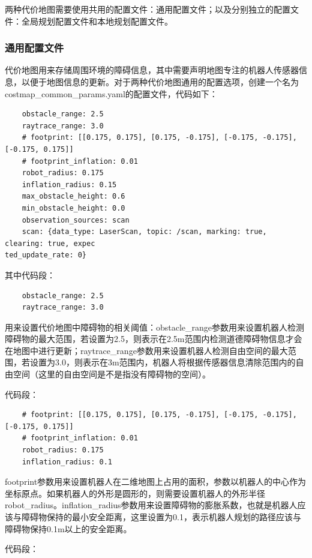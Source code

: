 \documentclass[9pt, oneside]{book}
\begin{document}
两种代价地图需要使用共用的配置文件：通用配置文件；以及分别独立的配置文件：全局规划配置文件和本地规划配置文件。

\subsubsection{通用配置文件}

代价地图用来存储周围环境的障碍信息，其中需要声明地图专注的机器人传感器信息，以便于地图信息的更新。对于两种代价地图通用的配置选项，创建一个名为costmap\_common\_params.yaml的配置文件，代码如下：

\begin{verbatim}
    obstacle_range: 2.5
    raytrace_range: 3.0
    # footprint: [[0.175, 0.175], [0.175, -0.175], [-0.175, -0.175], [-0.175, 0.175]]
    # footprint_inflation: 0.01
    robot_radius: 0.175
    inflation_radius: 0.15
    max_obstacle_height: 0.6
    min_obstacle_height: 0.0
    observation_sources: scan
    scan: {data_type: LaserScan, topic: /scan, marking: true, clearing: true, expec
ted_update_rate: 0}
\end{verbatim}

其中代码段：

\begin{verbatim}
    obstacle_range: 2.5
    raytrace_range: 3.0
\end{verbatim}

用来设置代价地图中障碍物的相关阈值：obstacle\_range参数用来设置机器人检测障碍物的最大范围，若设置为2.5，则表示在2.5m范围内检测道德障碍物信息才会在地图中进行更新；raytrace\_range参数用来设置机器人检测自由空间的最大范围，若设置为3.0，则表示在3m范围内，机器人将根据传感器信息清除范围内的自由空间\textcolor[rgb]{1,0,0}{（这里的自由空间是不是指没有障碍物的空间）}。

代码段：

\begin{verbatim}
    # footprint: [[0.175, 0.175], [0.175, -0.175], [-0.175, -0.175], [-0.175, 0.175]]
    # footprint_inflation: 0.01
    robot_radius: 0.175
    inflation_radius: 0.1
\end{verbatim}

footprint参数用来设置机器人在二维地图上占用的面积，参数以机器人的中心作为坐标原点。如果机器人的外形是圆形的，则需要设置机器人的外形半径robot\_radius。inflation\_radius参数用来设置障碍物的膨胀系数，也就是机器人应该与障碍物保持的最小安全距离，这里设置为0.1，表示机器人规划的路径应该与障碍物保持0.1m以上的安全距离。

代码段：
\end{document}
